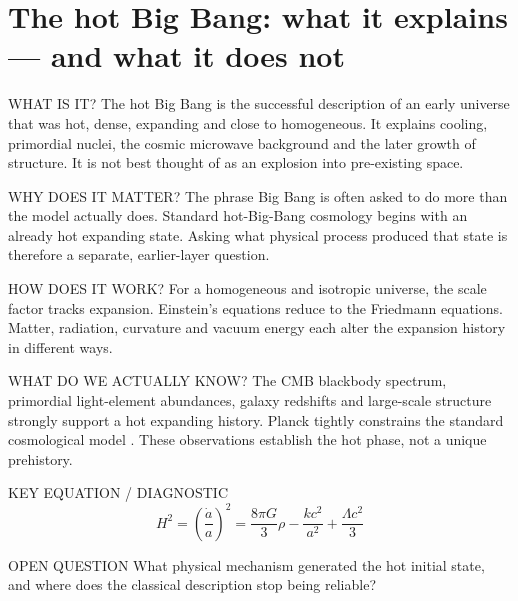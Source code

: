 \documentclass[10pt,a4paper]{report}
\begin{document}
\chapter{The hot Big Bang: what it explains — and what it does not}
\begin{minipage}[t]{0.48\textwidth}
\begin{studybox}{WHAT IS IT?}
The hot Big Bang is the successful description of an early universe that was hot, dense, expanding and close to homogeneous. It explains cooling, primordial nuclei, the cosmic microwave background and the later growth of structure. It is not best thought of as an explosion into pre-existing space.
\end{studybox}
\begin{studybox}{WHY DOES IT MATTER?}
The phrase Big Bang is often asked to do more than the model actually does. Standard hot-Big-Bang cosmology begins with an already hot expanding state. Asking what physical process produced that state is therefore a separate, earlier-layer question.
\end{studybox}
\end{minipage}\hfill
\begin{minipage}[t]{0.48\textwidth}
\begin{studybox}{HOW DOES IT WORK?}
For a homogeneous and isotropic universe, the scale factor tracks expansion. Einstein's equations reduce to the Friedmann equations. Matter, radiation, curvature and vacuum energy each alter the expansion history in different ways.
\end{studybox}
\begin{studybox}{WHAT DO WE ACTUALLY KNOW?}
The CMB blackbody spectrum, primordial light-element abundances, galaxy redshifts and large-scale structure strongly support a hot expanding history. Planck tightly constrains the standard cosmological model \cite{planck2018params}. These observations establish the hot phase, not a unique prehistory.
\end{studybox}
\end{minipage}

\begin{equationbox}{KEY EQUATION / DIAGNOSTIC}
\[
\displaystyle H^2=\left(\frac{\dot a}{a}\right)^2=\frac{8\pi G}{3}\rho-\frac{k c^2}{a^2}+\frac{\Lambda c^2}{3}
\]
\end{equationbox}

\begin{openbox}{OPEN QUESTION}
What physical mechanism generated the hot initial state, and where does the classical description stop being reliable?
\end{openbox}
\end{document}
